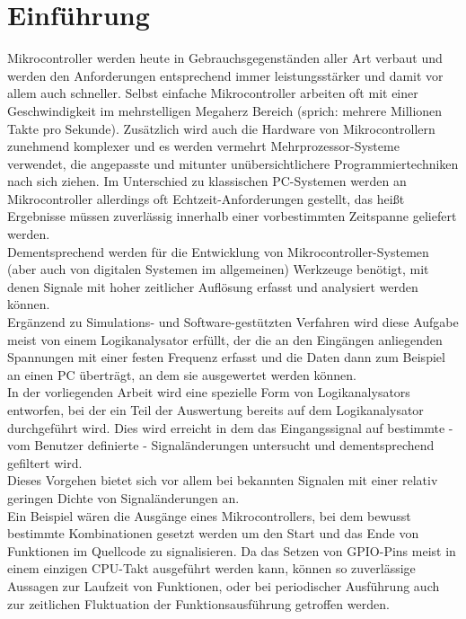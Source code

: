 \chapter{Einführung}

\label{ch:Einfuehrung}

Mikrocontroller werden heute in Gebrauchsgegenständen aller Art verbaut und werden den Anforderungen entsprechend immer leistungsstärker und damit vor allem auch schneller. Selbst einfache Mikrocontroller arbeiten oft mit einer Geschwindigkeit im mehrstelligen Megaherz Bereich (sprich: mehrere Millionen Takte pro Sekunde). Zusätzlich wird auch die Hardware von Mikrocontrollern zunehmend komplexer und es werden vermehrt Mehrprozessor-Systeme verwendet, die angepasste und mitunter unübersichtlichere Programmiertechniken nach sich ziehen.
Im Unterschied zu klassischen PC-Systemen werden an Mikrocontroller allerdings oft Echtzeit-Anforderungen gestellt, das heißt Ergebnisse müssen zuverlässig innerhalb einer vorbestimmten Zeitspanne geliefert werden\cite{wiki:echtzeit}.\\ 
Dementsprechend werden für die Entwicklung von Mikrocontroller-Systemen (aber auch von digitalen Systemen im allgemeinen) Werkzeuge benötigt, mit denen Signale mit hoher zeitlicher Auflösung erfasst und analysiert werden können.\\
Ergänzend zu Simulations- und Software-gestützten Verfahren wird diese Aufgabe meist von einem Logikanalysator erfüllt, der die an den Eingängen anliegenden Spannungen mit einer festen Frequenz erfasst und die Daten dann zum Beispiel an einen PC überträgt, an dem sie ausgewertet werden können.\\
In der vorliegenden Arbeit wird eine spezielle Form von Logikanalysators entworfen, bei der ein Teil der Auswertung bereits auf dem Logikanalysator durchgeführt wird. Dies wird erreicht in dem das Eingangssignal auf bestimmte - vom Benutzer definierte - Signaländerungen untersucht und dementsprechend gefiltert wird.\\
Dieses Vorgehen bietet sich vor allem bei bekannten Signalen mit einer relativ geringen Dichte von Signaländerungen an.\\
Ein Beispiel wären die Ausgänge eines Mikrocontrollers, bei dem bewusst bestimmte Kombinationen gesetzt werden um den Start und das Ende von Funktionen im Quellcode zu signalisieren. Da das Setzen von GPIO-Pins meist in einem einzigen CPU-Takt ausgeführt werden kann, können so zuverlässige Aussagen zur Laufzeit von Funktionen, oder bei periodischer Ausführung auch zur zeitlichen Fluktuation der Funktionsausführung getroffen werden.


